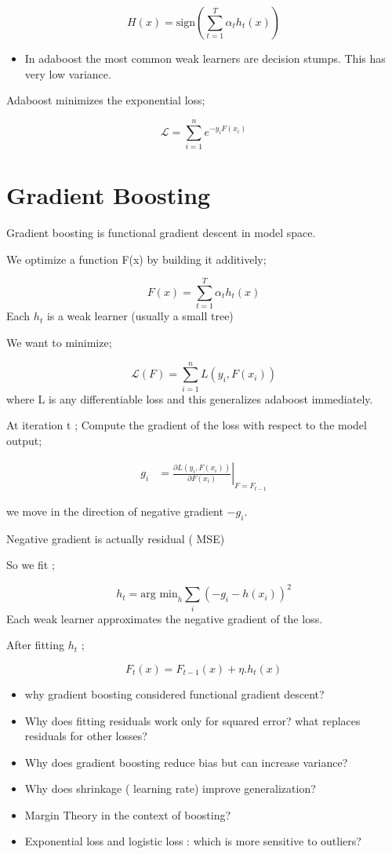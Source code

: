 \documentclass[10pt,a4paper]{article}
\begin{document}
	
		$$		H(x) = \text{sign}\left(\sum_{t=1}^{T} \alpha_t h_t(x)\right)
		$$
	
		\begin{itemize}
			\item In adaboost the most common weak learners are decision stumps. This has very low variance.
		\end{itemize}
	
		Adaboost minimizes the exponential loss;
	
		$$		\mathcal{L} = \sum_{i=1}^{n} e^{-y_i F(x_i)}
		$$
	
		\section{Gradient Boosting}
	
		Gradient boosting is functional gradient descent in model space.
	
		We optimize a function F(x) by building it additively;
	
		$$	F(x) = \sum_{t=1}^{T} \alpha_t h_t(x)
		$$
		Each $h_t$ is a weak learner (usually a small tree)
	
		We want to minimize;
	
		$$	\mathcal{L}(F) = \sum_{i=1}^{n} L(y_i,F(x_i))
		$$
		where L is any differentiable loss and this generalizes adaboost immediately.
	
		At iteration t ; Compute the gradient of the loss with respect to the model output;
	
		\begin{align*}
			g_i&=\left.\frac{\partial L\!\left(y_i, F(x_i)\right)}{\partial F(x_i)}\right|_{F = F_{t-1}}
		\end{align*}
	
		we move in the direction of negative gradient $-g_i$.
	
		Negative gradient is actually residual ( MSE)
	
		So we fit ;
	
		$$	h_t = \text{arg min}_h \sum_{i}^{} (-g_i -h(x_i))^2
		$$
		Each weak learner approximates the negative gradient of the loss.
	
		After fitting $h_t$ ;
	
		$$	F_t(x) = F_{t-1}(x) + \eta.h_t(x)
		$$
		\begin{itemize}
			\item why gradient boosting considered functional gradient descent?
			\item Why does fitting residuals work only for squared error? what replaces residuals for other losses?
			\item Why does gradient boosting reduce bias but can increase variance?
			\item Why does shrinkage ( learning rate) improve generalization?
			\item Margin Theory in the context of boosting?
			\item Exponential loss and logistic loss : which is more sensitive to outliers?
		\end{itemize}
	
\end{document}
